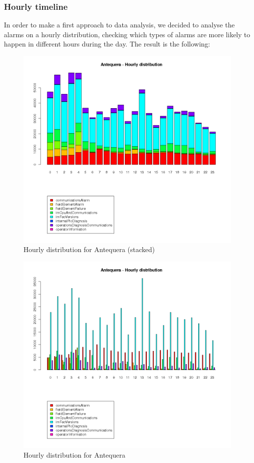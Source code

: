 \documentclass[a4paper,10pt]{book}
\begin{document}
\subsubsection{Hourly timeline}

In order to make a first approach to data analysis, we decided to analyse the alarms on a hourly distribution, checking which types of alarms are more likely to happen in different hours during the day. The result is the following:

\clearpage

\begin{figure}[h!]
 \centering
 \includegraphics[height=0.4\textheight]{./img/antequera_timeline.png}
 \caption{Hourly distribution for Antequera (stacked)}
\end{figure}
\begin{figure}[h!]
 \centering
 \includegraphics[height=0.4\textheight]{./img/antequera_timeline_b.png}
 \caption{Hourly distribution for Antequera}
\end{figure}
\end{document}
